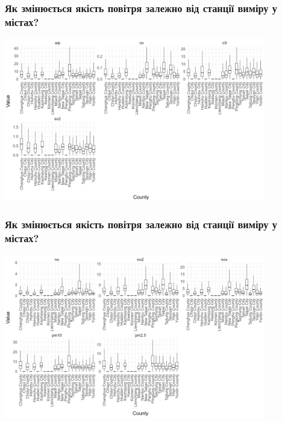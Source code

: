 \documentclass{beamer}
\begin{document}
\begin{frame}
  \frametitle{Як змінюється якість повітря залежно від станції виміру у містах?}

  \begin{center}
    \includegraphics[height=2.8in]{plots/question7/box-county-p1.png}
  \end{center}
\end{frame}

\begin{frame}
  \frametitle{Як змінюється якість повітря залежно від станції виміру у містах?}

  \begin{center}
    \includegraphics[height=2.8in]{plots/question7/box-county-p2.png}
  \end{center}
\end{frame}
\end{document}
